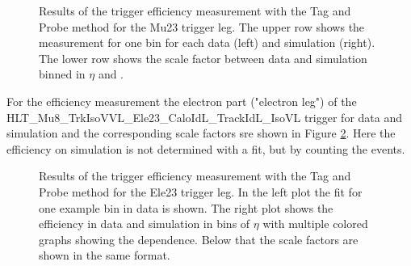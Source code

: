 \begin{figure}[htbp!]
\begin{center}
      \caption{Results of the trigger efficiency measurement with the Tag and Probe method for the Mu23 trigger leg. The upper row shows the measurement for one bin for each data (left) and simulation (right). The lower row shows 
       the scale factor between data and simulation binned in $\eta$ and \pt. }  
    \label{fig:TP_Mu23}
  \end{center}
\end{figure}

For the efficiency measurement the electron part ("electron leg") of the HLT\_Mu8\_TrkIsoVVL\_Ele23\_CaloIdL\_TrackIdL\_IsoVL trigger for data and simulation and the corresponding scale factors sre shown in Figure \ref{fig:TP_Ele23}.
Here the efficiency on simulation is not determined with a fit, but by counting the events.

\begin{figure}[htbp!]
  \begin{center}
      \caption{Results of the trigger efficiency measurement with the Tag and Probe method for the Ele23 trigger leg. In the left plot the fit for one example bin in data is shown. The right plot shows the efficiency in data and simulation in bins of $\eta$ with multiple colored graphs showing the \pt dependence. Below that the scale factors are shown in the same format. }  
    \label{fig:TP_Ele23}
  \end{center}
\end{figure}


